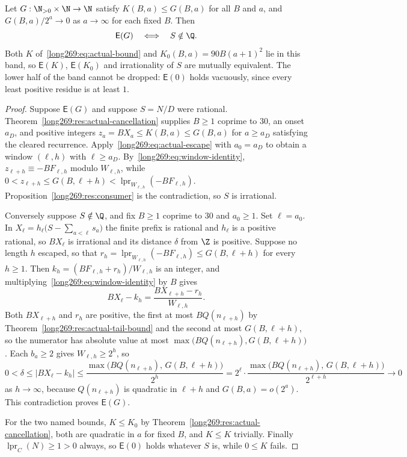 \documentclass[11pt]{article}
\newcommand{\lpr}{\operatorname{lpr}}
\newcommand{\Esc}{\mathsf E}
\begin{document}
\begin{theorem}\label{long269:res:actual-escape-endpoint}
\label{long269:res:lead-escape-equivalence}\label{long269:res:windowconsumer}
Let $G:\N_{>0}\times\N\to\N$ satisfy $K(B,a)\le G(B,a)$ for all $B$ and $a$,
and $G(B,a)/2^{a}\to0$ as $a\to\infty$ for each fixed $B$.  Then
\[
 \Esc(G)\quad\Longleftrightarrow\quad S\notin\Q .
\]
Both $K$ of~\eqref{long269:eq:actual-bound} and $K_0(B,a)=90B(a+1)^{2}$ lie in this
band, so $\Esc(K)$, $\Esc(K_0)$ and irrationality of $S$ are mutually
equivalent.  The lower half of the band cannot be dropped: $\Esc(0)$ holds
vacuously, since every least positive residue is at least $1$.
\end{theorem}

\begin{proof}
Suppose $\Esc(G)$ and suppose $S=N/D$ were rational.
Theorem~\ref{long269:res:actual-cancellation} supplies $B\ge1$ coprime to $30$, an
onset $a_D$, and positive integers $z_a=BX_a\le K(B,a)\le G(B,a)$ for
$a\ge a_D$ satisfying the cleared recurrence.  Apply~\eqref{long269:eq:actual-escape}
with $a_0=a_D$ to obtain a window $(\ell,h)$ with $\ell\ge a_D$.
By~\eqref{long269:eq:window-identity}, $z_{\ell+h}\equiv-BF_{\ell,h}$ modulo
$W_{\ell,h}$, while $0<z_{\ell+h}\le G(B,\ell+h)<\lpr_{W_{\ell,h}}(-BF_{\ell,h})$.
Proposition~\ref{long269:res:consumer} is the contradiction, so $S$ is irrational.

Conversely suppose $S\notin\Q$, and fix $B\ge1$ coprime to $30$ and $a_0\ge1$.
Set $\ell=a_0$.  In $X_\ell=h_\ell\bigl(S-\sum_{a<\ell}s_a\bigr)$ the finite
prefix is rational and $h_\ell$ is a positive rational, so $BX_\ell$ is
irrational and its distance $\delta$ from $\Z$ is positive.  Suppose no length
$h$ escaped, so that $r_h=\lpr_{W_{\ell,h}}(-BF_{\ell,h})\le G(B,\ell+h)$ for
every $h\ge1$.  Then $k_h=(BF_{\ell,h}+r_h)/W_{\ell,h}$ is an integer, and
multiplying~\eqref{long269:eq:window-identity} by $B$ gives
\[
 BX_\ell-k_h=\frac{BX_{\ell+h}-r_h}{W_{\ell,h}} .
\]
Both $BX_{\ell+h}$ and $r_h$ are positive, the first at most
$BQ(n_{\ell+h})$ by Theorem~\ref{long269:res:actual-tail-bound} and the second at most
$G(B,\ell+h)$, so the numerator has absolute value at most
$\max\bigl(BQ(n_{\ell+h}),G(B,\ell+h)\bigr)$.  Each $b_a\ge2$ gives
$W_{\ell,h}\ge2^{h}$, so
\[
 0<\delta\le|BX_\ell-k_h|
 \le\frac{\max\bigl(BQ(n_{\ell+h}),\,G(B,\ell+h)\bigr)}{2^{h}}
 =2^{\ell}\cdot
 \frac{\max\bigl(BQ(n_{\ell+h}),\,G(B,\ell+h)\bigr)}{2^{\ell+h}}
 \longrightarrow0
\]
as $h\to\infty$, because $Q(n_{\ell+h})$ is quadratic in $\ell+h$ and
$G(B,a)=o(2^{a})$.  This contradiction proves $\Esc(G)$.

For the two named bounds, $K\le K_0$ by
Theorem~\ref{long269:res:actual-cancellation}, both are quadratic in $a$ for fixed $B$,
and $K\le K$ trivially.  Finally $\lpr_C(N)\ge1>0$ always, so $\Esc(0)$ holds
whatever $S$ is, while $0\le K$ fails.
\end{proof}
\end{document}
